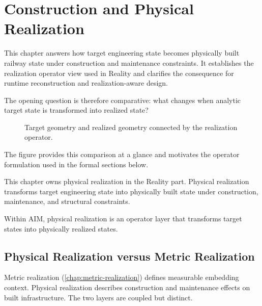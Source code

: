 
\chapter{Construction and Physical Realization}

\label{chap:construction-and-realization}

This chapter answers how target engineering state becomes physically
built railway state under construction and maintenance constraints. It
establishes the realization operator view used in Reality and clarifies
the consequence for runtime reconstruction and realization-aware design.

The opening question is therefore comparative: what changes when
analytic target state is transformed into realized state?

\begin{figure}[htbp]
\centering

\caption{Target geometry and realized geometry connected by the realization operator.}
\label{fig:target-vs-realized-geometry}
\end{figure}

The figure provides this comparison at a glance and motivates the
operator formulation used in the formal sections below.

This chapter owns physical realization in the Reality part. Physical
realization transforms target engineering state into physically built
state under construction, maintenance, and structural constraints.

\begin{principle}
\label{princ:realization-principle}
Within AIM, physical realization is an operator layer that transforms
target states into physically realized states.
\end{principle}

\section{Physical Realization versus Metric Realization}

Metric realization (\cref{chap:metric-realization}) defines measurable
embedding context. Physical realization describes construction and
maintenance effects on built infrastructure. The two layers are coupled
but distinct.

